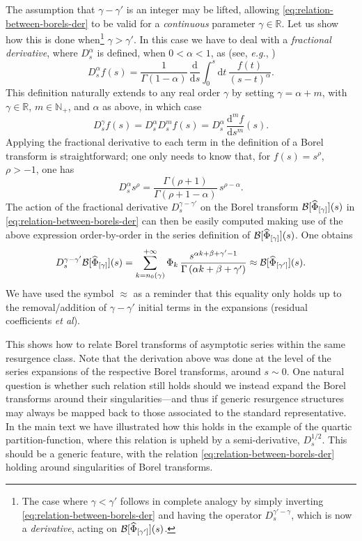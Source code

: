 \documentclass[11pt,a4paper]{article}
\newcommand{\CB}{{\cal B}}
\def\BN{{\mathbb N}}
\def\BR{{\mathbb R}}
\newcommand{\be}{\begin{equation}}
\newcommand{\ee}{\end{equation}}
\newcommand{\rmd}{{\mathrm{d}}}
\begin{document}
The assumption that $\gamma-\gamma'$ is an integer may be lifted, allowing \eqref{eq:relation-between-borels-der} to be valid for a \textit{continuous} parameter $\gamma \in \BR$. Let us show how this is done when\footnote{The case where $\gamma<\gamma'$ follows in complete analogy by simply inverting \eqref{eq:relation-between-borels-der} and having the operator $D_s^{\gamma'-\gamma}$, which is now a \textit{derivative}, acting on $\CB [ \widehat{\Phi}_{[\gamma']} ] (s)$.} $\gamma>\gamma'$. In this case we have to deal with a \textit{fractional derivative}, where $D_s^\alpha$ is defined, when $0<\alpha<1$, as (see, \textit{e.g.}, \cite{lot76})
%
\begin{equation}
D_s^\alpha f(s) = \frac{1}{\Gamma \left(1-\alpha\right)}\, \frac{\rmd}{\rmd s} \int_0^s \rmd t\, \frac{f(t)}{\left( s-t \right)^{\alpha}}.
\end{equation}
%
\noindent
This definition naturally extends to any real order $\gamma$ by setting $\gamma = \alpha + m$, with $\gamma \in \BR$, $m \in \BN_+$, and $\alpha$ as above, in which case
%
\be
D_s^\gamma f(s) = D_s^\alpha D_s^m f(s) = D_s^\alpha\, \frac{\rmd^m f}{\rmd s^m} (s).
\ee
%
\noindent
Applying the fractional derivative to each term in the definition of a Borel transform is straightforward; one only needs to know that, for $f(s) = s^\rho$, $\rho>-1$, one has
%
\begin{equation}
D_s^\alpha s^\rho = \frac{\Gamma \left(\rho+1\right)}{\Gamma \left(\rho+1-\alpha\right)}\, s^{\rho-\alpha}.
\end{equation}
%
\noindent
The action of the fractional derivative $D_s^{\gamma-\gamma'}$ on the Borel transform $\CB [ \widehat{\Phi}_{[\gamma]} ] (s)$ in \eqref{eq:relation-between-borels-der} can then be easily computed making use of the above expression order-by-order in the series definition of $\CB [ \widehat{\Phi}_{[\gamma]} ] (s)$. One obtains
%
\be
D_s^{\gamma-\gamma'} \CB [ \widehat{\Phi}_{[\gamma]} ] (s) = \sum_{k=n_0(\gamma)}^{+\infty} \Phi_k\, \frac{s^{\alpha k + \beta + \gamma' - 1}}{\Gamma \left( \alpha k + \beta + \gamma' \right)} \approx \CB [ \widehat{\Phi}_{[\gamma']} ] (s).
\ee
%
\noindent
We have used the symbol $\approx$ as a reminder that this equality only holds up to the removal/addition of $\gamma-\gamma'$ initial terms in the expansions (residual coefficients \textit{et al}).

This shows how to relate Borel transforms of asymptotic series within the same resurgence class. Note that the derivation above was done at the level of the series expansions of the respective Borel transforms, around $s \sim 0$. One natural question is whether such relation still holds should we instead expand the Borel transforms around their singularities---and thus if generic resurgence structures may always be mapped back to those associated to the standard representative. In the main text we have illustrated how this holds in the example of the quartic partition-function, where this relation is upheld by a semi-derivative, $D_s^{1/2}$. This should be a generic feature, with the relation \eqref{eq:relation-between-borels-der} holding around singularities of Borel transforms.
\end{document}
